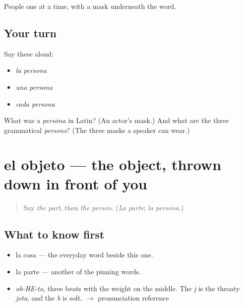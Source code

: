 \begin{grammarlens}[title={What you've built}]
People one at a time, with a mask underneath the word.
\end{grammarlens}

\subsection*{Your turn}
Say these aloud:

\begin{itemize}
\raggedright
  \item \emph{la persona}
  \item \emph{una persona}
  \item \emph{cada persona}
\end{itemize}

\begin{tcolorbox}[breakable,colback=teal!4,colframe=teal!35!black,title={Before you move on}]
What was a \emph{persōna} in Latin? (An actor's mask.) And what are the three grammatical \emph{persons}? (The three masks a speaker can wear.)
\end{tcolorbox}
\section[el objeto]{el objeto — the object, thrown down in front of you}

\label{lesson:ES-C345-objeto}



\begin{quote}
Say \emph{the part}, then \emph{the person}. (\emph{La parte}; \emph{la persona}.)
\end{quote}

\subsection*{What to know first}
\begin{itemize}
\raggedright
  \item la cosa — the everyday word beside this one.
  \item la parte — another of the pinning words.
\end{itemize}

\begin{sounds}
\begin{itemize}
\raggedright
  \item \emph{ob-HE-to}, three beats with the weight on the middle. The \emph{j} is the throaty \emph{jota}, and the \emph{b} is soft. $\to$ pronunciation reference
\end{itemize}
\end{sounds}

